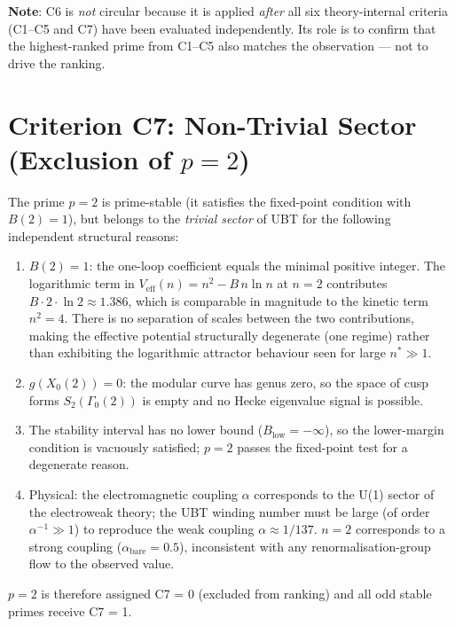 \documentclass[12pt,a4paper]{article}
\theoremstyle{definition}
\theoremstyle{remark}
\begin{document}
\textbf{Note}: C6 is \emph{not} circular because it is applied \emph{after}
all six theory-internal criteria (C1–C5 and C7) have been evaluated
independently.  Its role is to confirm that the highest-ranked prime from
C1–C5 also matches the observation — not to drive the ranking.

\section{Criterion C7: Non-Trivial Sector (Exclusion of $p = 2$)}
\label{sec:spr:c7}

The prime $p = 2$ is prime-stable (it satisfies the fixed-point condition
with $B(2) = 1$), but belongs to the \emph{trivial sector} of UBT for
the following independent structural reasons:
\begin{enumerate}
  \item $B(2) = 1$: the one-loop coefficient equals the minimal positive integer.
        The logarithmic term in $V_{\mathrm{eff}}(n) = n^2 - B\,n\ln n$ at $n=2$
        contributes $B \cdot 2 \cdot \ln 2 \approx 1.386$, which is comparable
        in magnitude to the kinetic term $n^2 = 4$.  There is no separation of
        scales between the two contributions, making the effective potential
        structurally degenerate (one regime) rather than exhibiting the
        logarithmic attractor behaviour seen for large $n^* \gg 1$.
  \item $g(X_0(2)) = 0$: the modular curve has genus zero, so the space
        of cusp forms $S_2(\Gamma_0(2))$ is empty and no Hecke eigenvalue
        signal is possible.
  \item The stability interval has no lower bound ($B_{\mathrm{low}}
        = -\infty$), so the lower-margin condition is vacuously satisfied;
        $p = 2$ passes the fixed-point test for a degenerate reason.
  \item Physical: the electromagnetic coupling $\alpha$ corresponds to the
        U(1) sector of the electroweak theory; the UBT winding number
        must be large (of order $\alpha^{-1} \gg 1$) to reproduce the
        weak coupling $\alpha \approx 1/137$.
        $n = 2$ corresponds to a strong coupling ($\alpha_{\mathrm{bare}} = 0.5$),
        inconsistent with any renormalisation-group flow to the observed value.
\end{enumerate}
$p = 2$ is therefore assigned C7 = 0 (excluded from ranking)
and all odd stable primes receive C7 = 1.
\end{document}
